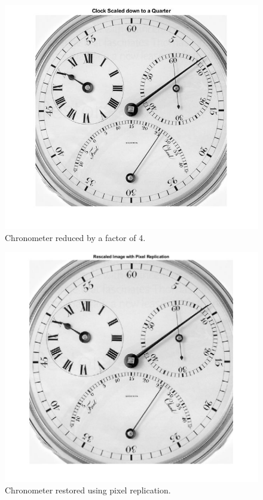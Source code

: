 \documentclass[../report1_rarnold.tex]{subfiles}
\begin{document}
  	\begin{figure}[!htbp]
		\centering
		\includegraphics[scale=0.40]{"chrono_fourth"}
		\caption{Chronometer reduced by a factor of 4.} 
		\label{2a}
	\end{figure}	
	
	\begin{figure}[!htbp]
		\centering
		\includegraphics[scale=0.40]{"pixel_rep"}
		\caption{Chronometer restored using pixel replication.} 
		\label{2b}
	\end{figure}	
	
\end{document}
